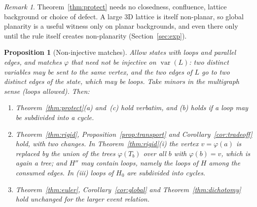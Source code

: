 \documentclass[10pt]{article}
\theoremstyle{definition}
\theoremstyle{plain}
\newtheorem{proposition}[theorem]{Proposition}
\theoremstyle{remark}
\newtheorem{remark}{Remark}
\DeclareMathOperator{\var}{var}
\begin{document}
\begin{remark}
Theorem~\ref{thm:protect} needs no closedness, confluence, lattice background or choice of defect. A large 3D lattice is itself non-planar, so global planarity is a useful witness only on planar backgrounds, and even there only until the rule itself creates non-planarity (Section~\ref{sec:exp}).
\end{remark}

\begin{proposition}[Non-injective matches]\label{prop:noninj}
Allow states with loops and parallel edges, and matches $\varphi$ that need not be injective on $\var(L)$: two distinct variables may be sent to the same vertex, and the two edges of $L$ go to two distinct edges of the state, which may be loops. Take minors in the multigraph sense (loops allowed). Then:
\begin{enumerate}
\item[(a)] Theorem~\ref{thm:protect}(a) and~(c) hold verbatim, and (b) holds if a loop may be subdivided into a cycle.
\item[(b)] Theorem~\ref{thm:rigid}, Proposition~\ref{prop:transport} and Corollary~\ref{cor:tradeoff} hold, with two changes. In Theorem~\ref{thm:rigid}(i) the vertex $v=\varphi(a)$ is replaced by the union of the trees $\varphi(T_b)$ over all $b$ with $\varphi(b)=v$, which is again a tree; and $H''$ may contain loops, namely the loops of $H$ among the consumed edges. In (iii) loops of $H_0$ are subdivided into cycles.
\item[(c)] Theorem~\ref{thm:euler}, Corollary~\ref{cor:global} and Theorem~\ref{thm:dichotomy} hold unchanged for the larger event relation.
\end{enumerate}
\end{proposition}
\end{document}
